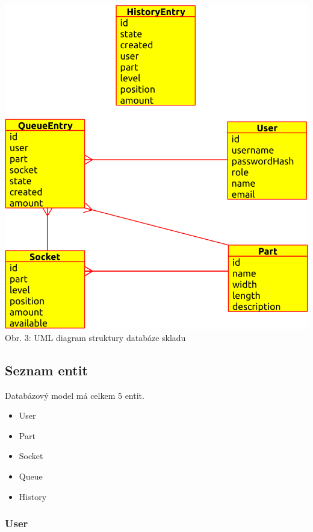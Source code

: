 \documentclass[12pt, a4paper, oneside]{article}
\begin{document}
\begin{center}
\hspace*{-2cm}
\includegraphics[scale=0.91]{img/entity_diagram.png}
\\
\caption{Obr. 3: UML diagram struktury databáze skladu}
\end{center}
\vspace{2mm}

\newpage
\subsection{Seznam entit}

Databázový model má celkem 5 entit.
\begin{itemize}
\item User
\item Part
\item Socket
\item Queue
\item History
\end{itemize}

\subsubsection{User}
\end{document}

